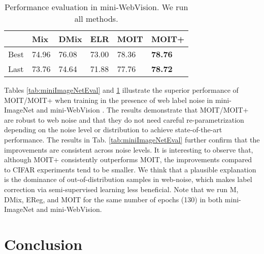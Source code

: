 \documentclass[final]{cvpr}
\begin{document}
\begin{table}[t]
\begin{centering}
\caption{\label{tab:WebVisionEval}Performance evaluation in mini-WebVision. We run all methods.}
\medskip{}
{\small{}}{\small\par}
\par\end{centering}
\centering{}{\small{}}\begin{tabularx}{\columnwidth}{llllll}
\toprule 

 & {\small{}Mix \cite{2018_ICLR_mixup}} & {\small{}DMix \cite{2020_ICLR_DivideMix}} & {\small{}ELR \cite{2020_NeurIPS_EarlyReg}} & {\small{}MOIT} & {\small{}MOIT+}\tabularnewline
\midrule 
{\small{}Best} & {\small{}74.96} & {\small{}76.08} & {\small{}73.00} & {\small{}78.36} & \textbf{\small{}78.76}\tabularnewline

{\small{}Last} & {\small{}73.76} & {\small{}74.64} & {\small{}71.88} & {\small{}77.76} & \textbf{\small{}78.72}\tabularnewline


\bottomrule 
\end{tabularx}{\small\par}
\end{table}
Tables \ref{tab:miniImageNetEval} and \ref{tab:WebVisionEval} illustrate the superior performance of MOIT/MOIT+ when training in the presence of web label noise in mini-ImageNet \cite{2020_ICML_DatasetOOD} and mini-WebVision \cite{2020_ICLR_DivideMix}. The results demonstrate that MOIT/MOIT+ are robust to web noise and that they do not need careful re-parametrization depending on the noise level or distribution to achieve state-of-the-art performance. The results in Tab. \ref{tab:miniImageNetEval} further confirm that the improvements are consistent across noise levels. It is interesting to observe that, although MOIT+ consistently outperforms MOIT, the improvements compared to CIFAR experiments tend to be smaller. We think that a plausible explanation is the dominance of out-of-distribution samples in web-noise, which makes label correction via semi-supervised learning less beneficial.
Note that we run M, DMix, EReg, and MOIT for the same number of epochs (130) in both mini-ImageNet and mini-WebVision.

\section{Conclusion}
\end{document}
